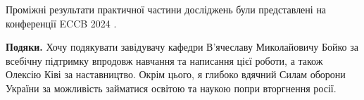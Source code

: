 Проміжні результати практичної частини досліджень були представлені на конференції ECCB 2024 \cite{fastlbp2024}.

\textbf{Подяки.}
Хочу подякувати завідувачу кафедри В'ячеславу Миколайовичу Бойко за всебічну підтримку впродовж навчання та написання цієї роботи, 
а також Олексію Ківі за наставництво.
Окрім цього, я глибоко вдячний Силам оборони України за можливість займатися освітою та наукою попри вторгнення росії. 
